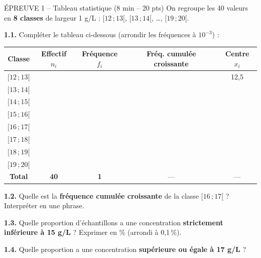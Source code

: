 \documentclass[11pt,a4paper]{article}
\begin{document}
\begin{epreuve}{ÉPREUVE 1 -- Tableau statistique \hfill \small (8 min -- 20 pts)}
On regroupe les 40 valeurs en \textbf{8 classes} de largeur 1 g/L :
$[12\,;13[$, $[13\,;14[$, \dots, $[19\,;20[$.

\vspace{0.2cm}
\textbf{1.1.} Compléter le tableau ci-dessous (arrondir les fréquences à $10^{-3}$) :

\vspace{0.2cm}
\renewcommand{\arraystretch}{1.5}
\begin{center}
\begin{tabular}{|c|c|c|c|c|}
\hline
\textbf{Classe} & \textbf{Effectif $n_i$} & \textbf{Fréquence $f_i$} & \textbf{Fréq. cumulée croissante} & \textbf{Centre $x_i$} \\
\hline
$[12\,;13[$ & & & & 12{,}5 \\
\hline
$[13\,;14[$ & & & & \\
\hline
$[14\,;15[$ & & & & \\
\hline
$[15\,;16[$ & & & & \\
\hline
$[16\,;17[$ & & & & \\
\hline
$[17\,;18[$ & & & & \\
\hline
$[18\,;19[$ & & & & \\
\hline
$[19\,;20[$ & & & & \\
\hline
\textbf{Total} & \textbf{40} & \textbf{1} & --- & --- \\
\hline
\end{tabular}
\end{center}

\vspace{0.2cm}
\textbf{1.2.} Quelle est la \textbf{fréquence cumulée croissante} de la classe $[16\,;17[$ ? Interpréter en une phrase.

\vspace{0.2cm}
\textbf{1.3.} Quelle proportion d'échantillons a une concentration \textbf{strictement inférieure à 15 g/L} ? Exprimer en \% (arrondi à 0{,}1\,\%).

\vspace{0.2cm}
\textbf{1.4.} Quelle proportion a une concentration \textbf{supérieure ou égale à 17 g/L} ?
\end{epreuve}

\newpage
\end{document}
